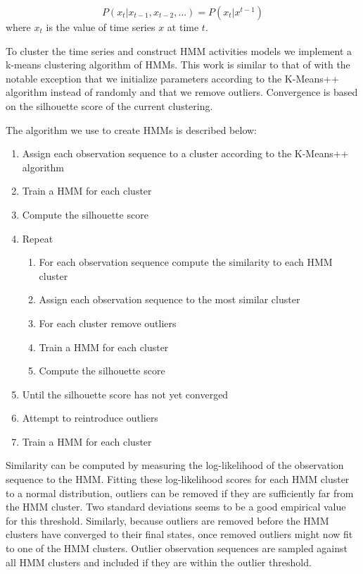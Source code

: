 \begin{equation}
\label{eq:markov}
P(x_{t}|x_{t - 1}, x_{t-2}, ...) = P(x_{t}|x^{t - 1})
\end{equation}
\noindent
where $x_{t}$ is the value of time series $x$ at time $t$.

To cluster the time series and construct HMM activities models we implement a k-means clustering algorithm of HMMs.  This work is similar to that of \cite{wren2006a} with the notable exception that we initialize parameters according to the K-Means++ algorithm \cite{arthur2007} instead of randomly and that we remove outliers.  Convergence is based on the silhouette \cite{Kaufman1990} score of the current clustering.  

{\singlespace
The algorithm we use to create HMMs is described below:
\begin{enumerate}
\item{Assign each observation sequence to a cluster according to the K-Means++ algorithm}
\item{Train a HMM for each cluster}
\item{Compute the silhouette score}
\item{Repeat}
\begin{enumerate}
\item{For each observation sequence compute the similarity to each HMM cluster}
\item{Assign each observation sequence to the most similar cluster}
\item{For each cluster remove outliers}
\item{Train a HMM for each cluster}
\item{Compute the silhouette score}
\end{enumerate}
\item{Until the silhouette score has not yet converged}
\item{Attempt to reintroduce outliers}
\item{Train a HMM for each cluster}
\end{enumerate}
}

Similarity can be computed by measuring the log-likelihood of the observation sequence to the HMM.  Fitting these log-likelihood scores for each HMM cluster to a normal distribution, outliers can be removed if they are sufficiently far from the HMM cluster.  Two standard deviations seems to be a good empirical value for this threshold.  Similarly, because outliers are removed before the HMM clusters have converged to their final states, once removed outliers might now fit to one of the HMM clusters.  Outlier observation sequences are sampled against all HMM clusters and included if they are within the outlier threshold.

